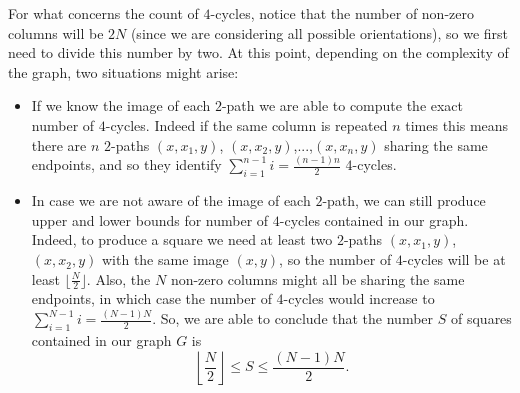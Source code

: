 \documentclass{article}
\begin{document}
	For what concerns the count of $4$-cycles, notice that the number of non-zero columns will be $2N$ (since we are considering all possible orientations), so we first need to divide this number by two.
	At this point, depending on the complexity of the graph, two situations might arise:
	\begin{itemize}
		\item If we know the image of each $2$-path we are able to compute the exact number of $4$-cycles. Indeed if the same column is repeated $n$ times this means there are $n$ $2$-paths $(x,x_1,y)$, $(x,x_2,y)$,...,$(x,x_n,y)$ sharing the same endpoints, and so they identify $\sum_{i=1}^{n-1} i=\frac{(n-1)n}{2}$ $4$-cycles.
		\item In case we are not aware of the image of each $2$-path, we can still produce upper and lower bounds for number of $4$-cycles contained in our graph.
		Indeed, to produce a square we need at least two $2$-paths $(x,x_1,y)$, $(x,x_2,y)$ with the same image $(x,y)$, so the number of $4$-cycles will be at least $\lfloor \frac{N}{2} \rfloor$.
		Also, the $N$ non-zero columns might all be sharing the same endpoints, in which case the number of $4$-cycles would increase to $\sum_{i=1}^{N-1} i=\frac{(N-1)N}{2}$.
		So, we are able to conclude that the number $S$ of squares contained in our graph $G$ is
		\[
		\left\lfloor \frac{N}{2} \right\rfloor \leq S \leq \frac{(N-1)N}{2}.
		\]
	\end{itemize}
	
\end{document}
